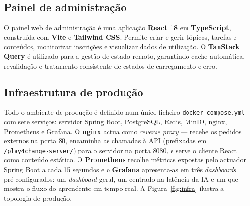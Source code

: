 \subsection*{Painel de administração}

\begin{sloppypar}
O painel web de administração é uma aplicação \textbf{React 18} em \textbf{TypeScript}, construída com \textbf{Vite} e \textbf{Tailwind CSS}. Permite criar e gerir tópicos, tarefas e conteúdos, monitorizar inscrições e visualizar dados de utilização. O \textbf{TanStack Query} é utilizado para a gestão de estado remoto, garantindo cache automática, revalidação e tratamento consistente de estados de carregamento e erro.
\end{sloppypar}

\subsection*{Infraestrutura de produção}

Todo o ambiente de produção é definido num único ficheiro \texttt{docker-compose.yml} com sete serviços: servidor Spring Boot, PostgreSQL, Redis, MinIO, nginx, Prometheus e Grafana. O \textbf{nginx} actua como \emph{reverse proxy} --- recebe os pedidos externos na porta 80, encaminha as chamadas à API (prefixadas em \texttt{/play4change-server/}) para o servidor na porta 8080, e serve o cliente React como conteúdo estático. O \textbf{Prometheus} recolhe métricas expostas pelo actuador Spring Boot a cada 15 segundos e o \textbf{Grafana} apresenta-as em três \emph{dashboards} pré-configurados: um \emph{dashboard} geral, um centrado na latência da IA e um que mostra o fluxo do aprendente em tempo real. A Figura~\ref{fig:infra} ilustra a topologia de produção.

